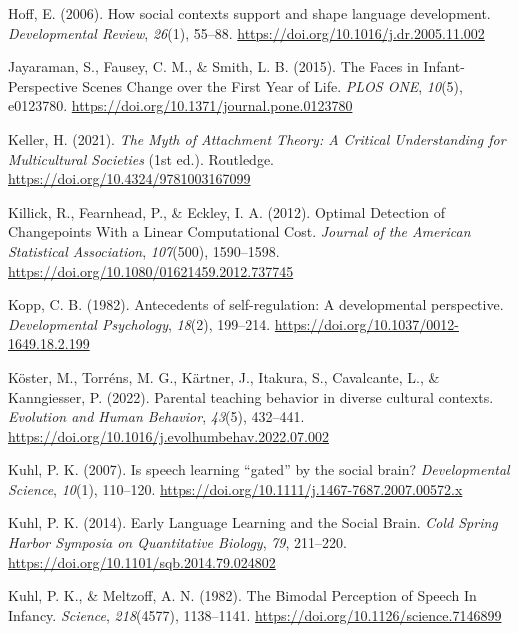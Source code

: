 \documentclass[
  english,
  12pt,
  man,floatsintext]{apa6}
\newlength{\cslhangindent}
\newenvironment{CSLReferences}[2] %
 {\begin{list}{}{%
  \setlength{\itemindent}{0pt}
  \setlength{\leftmargin}{0pt}
  \setlength{\parsep}{0pt}
  \ifodd #1
   \setlength{\leftmargin}{\cslhangindent}
   \setlength{\itemindent}{-1\cslhangindent}
  \fi
  \setlength{\itemsep}{#2\baselineskip}}}
 {\end{list}}
\begin{document}
\begin{CSLReferences}{1}{0}
Hoff, E. (2006). How social contexts support and shape language development. \emph{Developmental Review}, \emph{26}(1), 55--88. \url{https://doi.org/10.1016/j.dr.2005.11.002}

Jayaraman, S., Fausey, C. M., \& Smith, L. B. (2015). The {Faces} in {Infant-Perspective Scenes Change} over the {First Year} of {Life}. \emph{PLOS ONE}, \emph{10}(5), e0123780. \url{https://doi.org/10.1371/journal.pone.0123780}

Keller, H. (2021). \emph{The {Myth} of {Attachment Theory}: {A Critical Understanding} for {Multicultural Societies}} (1st ed.). Routledge. \url{https://doi.org/10.4324/9781003167099}

Killick, R., Fearnhead, P., \& Eckley, I. A. (2012). Optimal {Detection} of {Changepoints With} a {Linear Computational Cost}. \emph{Journal of the American Statistical Association}, \emph{107}(500), 1590--1598. \url{https://doi.org/10.1080/01621459.2012.737745}

Kopp, C. B. (1982). Antecedents of self-regulation: {A} developmental perspective. \emph{Developmental Psychology}, \emph{18}(2), 199--214. \url{https://doi.org/10.1037/0012-1649.18.2.199}

Köster, M., Torréns, M. G., Kärtner, J., Itakura, S., Cavalcante, L., \& Kanngiesser, P. (2022). Parental teaching behavior in diverse cultural contexts. \emph{Evolution and Human Behavior}, \emph{43}(5), 432--441. \url{https://doi.org/10.1016/j.evolhumbehav.2022.07.002}

Kuhl, P. K. (2007). Is speech learning {``gated''} by the social brain? \emph{Developmental Science}, \emph{10}(1), 110--120. \url{https://doi.org/10.1111/j.1467-7687.2007.00572.x}

Kuhl, P. K. (2014). Early {Language Learning} and the {Social Brain}. \emph{Cold Spring Harbor Symposia on Quantitative Biology}, \emph{79}, 211--220. \url{https://doi.org/10.1101/sqb.2014.79.024802}

Kuhl, P. K., \& Meltzoff, A. N. (1982). The {Bimodal Perception} of {Speech In Infancy}. \emph{Science}, \emph{218}(4577), 1138--1141. \url{https://doi.org/10.1126/science.7146899}


\end{CSLReferences}
\end{document}

